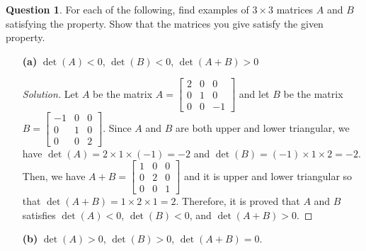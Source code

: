 \documentclass{article}
\theoremstyle{definition}
\newtheorem{question}{Question}
\begin{document}
\vspace{.75cm}

\label{Question 2}



\begin{question} For each of the following, find examples of $3\times 3$ matrices $A$ and $B$ satisfying the property. Show that the matrices you give satisfy the given property.

\vspace{.25cm}

\begin{enumerate}

\item[\textbf{(a)}] $\det(A) < 0$, $\det(B) < 0$, $\det(A+B) > 0$

\begin{proof}[Solution]
    Let \(A\) be the matrix \(A=
    \begin{bmatrix}
        2 & 0 & 0 \\
        0 & 1 & 0 \\
        0 & 0 & -1
    \end{bmatrix}\)
    and let \(B\) be the matrix \(B=
    \begin{bmatrix}
        -1 & 0 & 0 \\
        0 & 1 & 0 \\
        0 & 0 & 2
    \end{bmatrix}\). Since \(A\) and \(B\) are both upper and lower triangular, we have
    \(\det(A)=2\times1\times(-1)=-2\) and \(\det(B)=(-1)\times1\times2=-2\).
    Then, we have \(A+B=
    \begin{bmatrix}
        1 & 0 & 0 \\
        0 & 2 & 0 \\
        0 & 0 & 1
    \end{bmatrix}\) and it is upper and lower triangular so that \(\det(A+B)=1\times2\times1=2\).
    Therefore, it is proved that \(A\) and \(B\) satisfies \(\det(A)<0\),
    \(\det(B)<0\), and \(\det(A+B)>0\).
\end{proof}

\vspace{.25cm}

\item[\textbf{(b)}] $\det(A) > 0$, $\det(B) > 0$, $\det(A+B) = 0$.


\end{enumerate}
\end{question}
\end{document}
